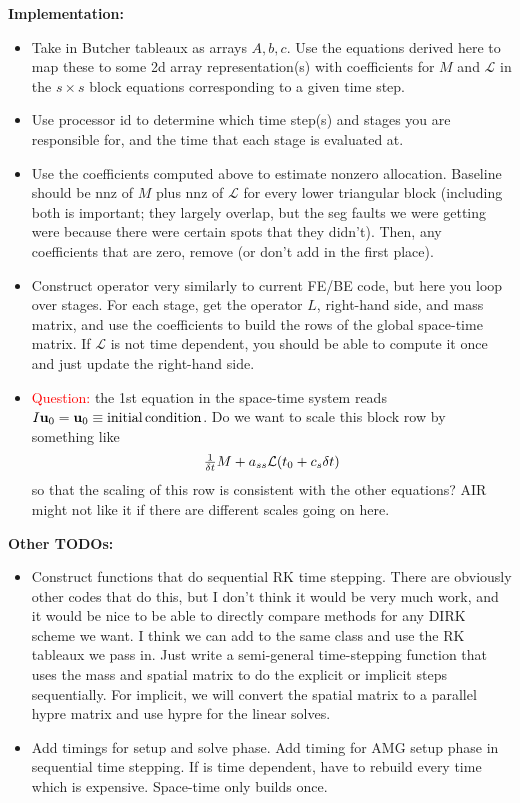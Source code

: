 \documentclass[a4paper,10pt]{article}
\begin{document}
\noindent\textbf{Implementation:}
\begin{itemize}
\item Take in Butcher tableaux as arrays $A,b,c$. Use the equations derived here to map these to some 2d array
representation(s) with coefficients for $M$ and $\mathcal{L}$ in the $s \times s$ block equations corresponding to
a given time step.

\item Use processor id to determine which time step(s) and stages you are responsible for, and the time that each
stage is evaluated at.

\item Use the coefficients computed above to estimate nonzero allocation. Baseline should be nnz of $M$ plus
nnz of $\mathcal{L}$ for every lower triangular block (including both is important; they largely overlap, but the
seg faults we were getting were because there were certain spots that they didn't). Then, any coefficients that
are zero, remove (or don't add in the first place).

\item Construct operator very similarly to current FE/BE code, but here you loop over stages. For each stage, get
the operator $L$, right-hand side, and mass matrix, and use the coefficients to build the rows of the global space-time
matrix. If $\mathcal{L}$ is not time dependent, you should be able to compute it once and just update the right-hand
side.

\item \textcolor{red}{Question:} the 1st equation in the space-time system reads $I \mathbf{u}_0 = \mathbf{u}_0 \equiv {\rm initial\, condition}$. Do we want to scale this block row by something like 
\[
\tfrac{1}{\delta t} M + a_{ss} {\cal L}(t_0 + c_s \delta t) 
\]
so that the scaling of this row is consistent with the other equations? AIR might not like it if there are different scales going on here.

\end{itemize}

\noindent\textbf{Other TODOs:}
\begin{itemize}
\item Construct functions that do sequential RK time stepping. There are obviously other codes that do
this, but I don't think it would be very much work, and it would be nice to be able to directly compare methods
for any DIRK scheme we want. I think we can add to the same class and use the RK tableaux we pass in. 
Just write a semi-general time-stepping function that uses the mass and spatial matrix to do the
explicit or implicit steps sequentially. For implicit, we will convert the spatial matrix to a parallel hypre
matrix and use hypre for the linear solves. 

\item Add timings for setup and solve phase. Add timing for AMG setup phase in sequential time stepping.
If is time dependent, have to rebuild every time which is expensive. Space-time only builds once. 

\end{itemize}
\end{document}
